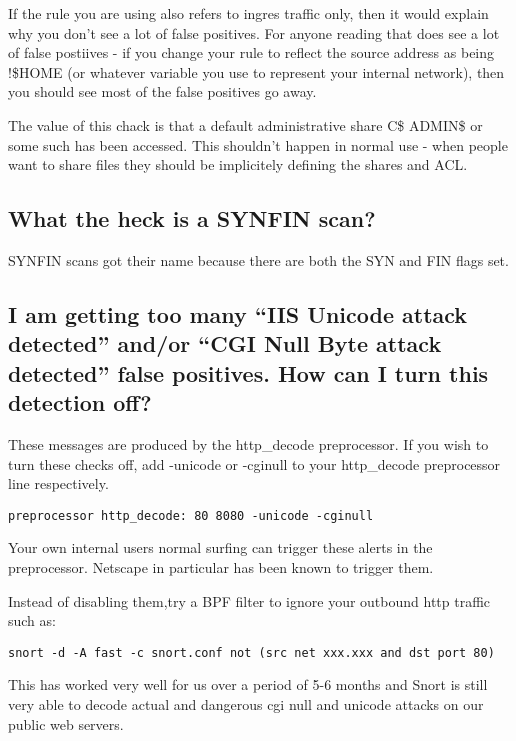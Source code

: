 \documentclass{article}
\begin{document}
If the rule you are using also refers to ingres traffic only, then it
would explain why you don't see a lot of false positives.  For anyone
reading that does see a lot of false postiives -  if you change your rule
to reflect the source address as being !\$HOME (or whatever variable you
use to represent your internal network), then you should see most of the
false positives go away.

The value of this chack is that a default administrative share C\$ ADMIN\$ or
some such has been accessed.  This shouldn't happen in normal use - when
people want to share files they should be implicitely defining the shares
and ACL.  

\subsection{What the heck is a SYNFIN scan? }

SYNFIN scans got their name because there are both the SYN and FIN flags set. 

\subsection{I am getting too many ``IIS Unicode attack detected'' and/or ``CGI Null Byte attack detected'' false positives.  How can I turn this detection off? }

These messages are produced by the http\_decode preprocessor.  If you wish
to turn these checks off, add -unicode or -cginull to your http\_decode
preprocessor line respectively.

\begin{verbatim}preprocessor http_decode: 80 8080 -unicode -cginull\end{verbatim}

Your own internal users normal surfing can trigger these alerts in the
preprocessor. Netscape in particular has been known to trigger them.

Instead of disabling them,try a BPF filter to ignore your outbound http
traffic such as:

\begin{verbatim}snort -d -A fast -c snort.conf not (src net xxx.xxx and dst port 80)\end{verbatim}

This has worked very well for us over a period of 5-6 months and Snort is
still very able to decode actual and dangerous cgi null and unicode attacks
on our public web servers.
\end{document}
